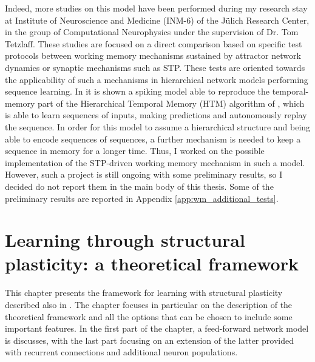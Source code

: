 \documentclass[a4paper, 12pt, twoside, openright]{book}
\begin{document}
Indeed, more studies on this model have been performed during my research stay at Institute of Neuroscience and Medicine (INM-6) of the Jülich Research Center, in the group of Computational Neurophysics under the supervision of Dr. Tom Tetzlaff. These studies are focused on a direct comparison based on specific test protocols between working memory mechanisms sustained by attractor network dynamics or synaptic mechanisms such as STP. These tests are oriented towards the applicability of such a mechanisms in hierarchical network models performing sequence learning. In \cite{Bouhadjar2022} it is shown a spiking model able to reproduce the temporal-memory part of the Hierarchical Temporal Memory (HTM) algorithm of \cite{hawkins2011cortical}, which is able to learn sequences of inputs, making predictions and autonomously replay the sequence. In order for this model to assume a hierarchical structure and being able to encode sequences of sequences, a further mechanism is needed to keep a sequence in memory for a longer time. Thus, I worked on the possible implementation of the STP-driven working memory mechanism in such a model. However, such a project is still ongoing with some preliminary results, so I decided do not report them in the main body of this thesis. Some of the preliminary results are reported in Appendix \ref{app:wm_additional_tests}.




\chapter{\textbf{Learning through structural plasticity: a theoretical framework}}
\label{chapter:structural_plasticity_theory}

\begin{tcolorbox}[colback=white,colframe=DarkRed,title=\textbf{Summary}]
This chapter presents the framework for learning with structural plasticity described also in \cite{Tiddia2023}. The chapter focuses in particular on the description of the theoretical framework and all the options that can be chosen to include some important features. In the first part of the chapter, a feed-forward network model is discusses, with the last part focusing on an extension of the latter provided with recurrent connections and additional neuron populations.
\end{tcolorbox}
\end{document}
